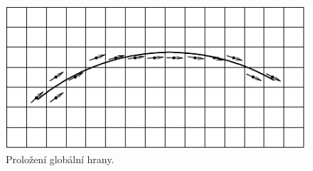 \begin{figure}[th]
    \begin{center}
        \includegraphics[scale=0.9]{08_segmentace/images/img_8_16.pdf}
    \end{center}
    \caption{Proložení globální hrany.}
    \label{img:8_16}
\end{figure}





